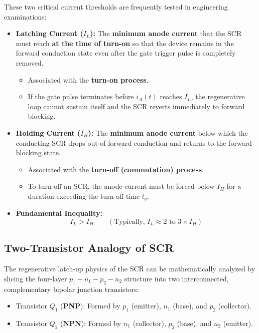 \documentclass[11pt,a4paper]{article}
\begin{document}
\begin{conceptbox}
These two critical current thresholds are frequently tested in engineering examinations:
\begin{itemize}[leftmargin=*]
  \item \textbf{Latching Current ($I_L$):} The \textbf{minimum anode current} that the SCR must reach \textbf{at the time of turn-on} so that the device remains in the forward conduction state even after the gate trigger pulse is completely removed.
  \begin{itemize}
    \item Associated with the \textbf{turn-on process}.
    \item If the gate pulse terminates before $i_A(t)$ reaches $I_L$, the regenerative loop cannot sustain itself and the SCR reverts immediately to forward blocking.
  \end{itemize}
  \item \textbf{Holding Current ($I_H$):} The \textbf{minimum anode current} below which the conducting SCR drops out of forward conduction and returns to the forward blocking state.
  \begin{itemize}
    \item Associated with the \textbf{turn-off (commutation) process}.
    \item To turn off an SCR, the anode current must be forced below $I_H$ for a duration exceeding the turn-off time $t_q$.
  \end{itemize}
  \item \textbf{Fundamental Inequality:}
  \begin{equation}
  I_L > I_H \qquad (\text{Typically, } I_L \approx 2 \text{ to } 3 \times I_H)
  \end{equation}
\end{itemize}
\end{conceptbox}

\subsection{Two-Transistor Analogy of SCR}

The regenerative latch-up physics of the SCR can be mathematically analyzed by slicing the four-layer $p_1-n_1-p_2-n_2$ structure into two interconnected, complementary bipolar junction transistors:
\begin{itemize}[leftmargin=*]
  \item Transistor $Q_1$ (\textbf{PNP}): Formed by $p_1$ (emitter), $n_1$ (base), and $p_2$ (collector).
  \item Transistor $Q_2$ (\textbf{NPN}): Formed by $n_1$ (collector), $p_2$ (base), and $n_2$ (emitter).
\end{itemize}
\end{document}
